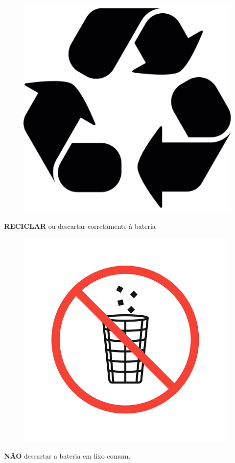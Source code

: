 \begin{center}
    \begin{figure}[H]
\centering
	\label{iconereciclar}					\includegraphics[keepaspectratio=true,scale=0.13]{Figuras/bateria/iconereciclar.png}
        \label{iconereciclar}
	
	\end{figure} 
	\textbf{RECICLAR} ou descartar corretamente à bateria
 \end{center}   
 
 \begin{center}

  \begin{figure}[H]
  \centering
	\label{iconelixo}					\includegraphics[keepaspectratio=true,scale=0.7]{Figuras/bateria/iconelixo.jpg}
        \label{iconelixo}
	
	\end{figure} 
      \textbf{NÃO} descartar a bateria em lixo comum.
 \end{center}  
